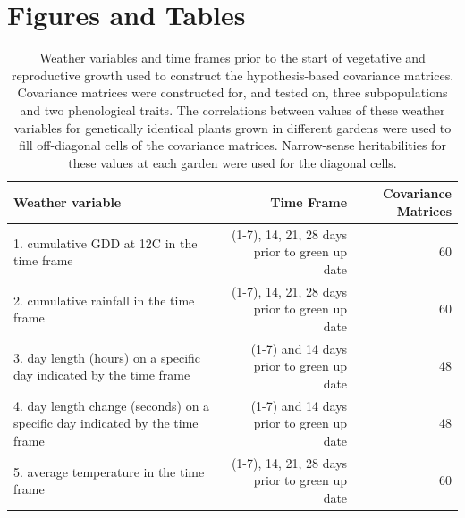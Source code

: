 \documentclass[
  9pt,
  twocolumn,
  twoside]{pnas-new}
\begin{document}
\section{Figures and Tables}\label{figures-and-tables}

\clearpage
\onecolumn
\begin{table}[t!]
\centering
\caption{Weather variables and time frames prior to the start of vegetative and reproductive growth used to construct the hypothesis-based covariance matrices. Covariance matrices were constructed for, and tested on, three subpopulations and two phenological traits. The correlations between values of these weather variables for genetically identical plants grown in different gardens were used to fill off-diagonal cells of the covariance matrices. Narrow-sense heritabilities for these values at each garden were used for the diagonal cells.}
\begin{tabular}{lrr}
Weather variable & Time Frame & Covariance Matrices \\
\midrule
1. cumulative GDD at 12C in the time frame & (1-7), 14, 21, 28 days prior to green up date & 60 \\
2. cumulative rainfall in the time frame & (1-7), 14, 21, 28 days prior to green up date & 60  \\
3. day length (hours) on a specific day indicated by the time frame & (1-7) and 14 days prior to green up date & 48 \\
4. day length change (seconds) on a specific day indicated by the time frame & (1-7) and 14 days prior to green up date & 48 \\
5. average temperature in the time frame & (1-7), 14, 21, 28 days prior to green up date & 60 \\
\bottomrule
\end{tabular}

\end{table}
\clearpage
\twocolumn
\end{document}
